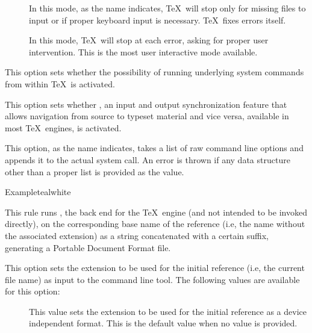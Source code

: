 \begin{description}
\begin{description}
\begin{description}
\item[] In this mode, as the name indicates, \TeX\ will stop only for missing files to input or if proper keyboard input is necessary. \TeX\ fixes errors itself.

\item[] In this mode, \TeX\ will stop at each error, asking for proper user intervention. This is the most user interactive mode available.
\end{description}

\item[\rpsbox{shell}] This option sets whether the possibility of running underlying system commands from within \TeX\ is activated.

\item[\rpsbox{synctex}] This option sets whether , an input and output synchronization feature that allows navigation from source to typeset material and vice versa, available in most \TeX\ engines, is activated.

\item[\abox{options}] This option, as the name indicates, takes a list of raw command line options and appends it to the actual system call. An error is thrown if any data structure other than a proper list is provided as the value.
\end{description}

\begin{codebox}{Example}{teal}{\icnote}{white}
\end{codebox}

\item[\rulebox{xdvipdfmx}]
This rule runs , the back end for the  \TeX\ engine (and not intended to be invoked directly), on the corresponding base name of the  reference (i.e, the name without the associated extension) as a string concatenated with a certain suffix, generating a Portable Document Format  file.

\item[\abox{entry}] This option sets the extension to be used for the initial reference (i.e, the current file name) as input to the command line tool. The following values are available for this option:

\begin{description}
\item[] This value sets the extension to be used for the initial reference as a device independent format. This is the default value when no value is provided.


\end{description}
\end{description}
